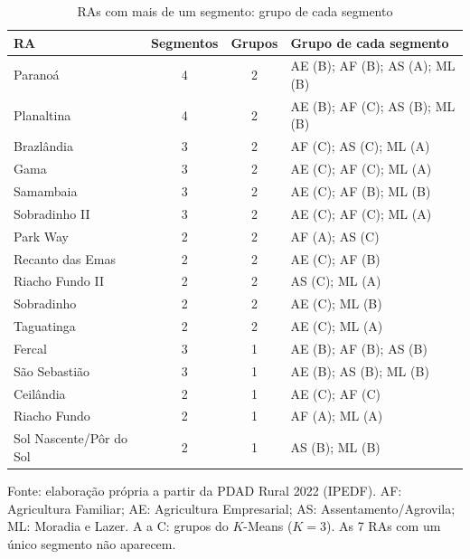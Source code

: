 \begin{table}[htbp]
\centering
\caption{RAs com mais de um segmento: grupo de cada segmento}
\label{tab:ra_segmentos}
\small
\begin{tabular}{l c c p{5.6cm}}
\hline
\textbf{RA} & \textbf{Segmentos} & \textbf{Grupos} & \textbf{Grupo de cada segmento} \\ \hline
Paranoá & 4 & 2 & AE (B); AF (B); AS (A); ML (B) \\
Planaltina & 4 & 2 & AE (B); AF (C); AS (B); ML (B) \\
Brazlândia & 3 & 2 & AF (C); AS (C); ML (A) \\
Gama & 3 & 2 & AE (C); AF (C); ML (A) \\
Samambaia & 3 & 2 & AE (C); AF (B); ML (B) \\
Sobradinho II & 3 & 2 & AE (C); AF (C); ML (A) \\
Park Way & 2 & 2 & AF (A); AS (C) \\
Recanto das Emas & 2 & 2 & AE (C); AF (B) \\
Riacho Fundo II & 2 & 2 & AS (C); ML (A) \\
Sobradinho & 2 & 2 & AE (C); ML (B) \\
Taguatinga & 2 & 2 & AE (C); ML (A) \\
\hline
Fercal & 3 & 1 & AE (B); AF (B); AS (B) \\
São Sebastião & 3 & 1 & AE (B); AS (B); ML (B) \\
Ceilândia & 2 & 1 & AE (C); AF (C) \\
Riacho Fundo & 2 & 1 & AF (A); ML (A) \\
Sol Nascente/Pôr do Sol & 2 & 1 & AS (B); ML (B) \\
\hline
\end{tabular}
\par\footnotesize Fonte: elaboração própria a partir da PDAD Rural 2022 (IPEDF). AF: Agricultura Familiar; AE: Agricultura Empresarial; AS: Assentamento/Agrovila; ML: Moradia e Lazer. A a C: grupos do $K$-Means ($K = 3$). As 7 RAs com um único segmento não aparecem.
\end{table}